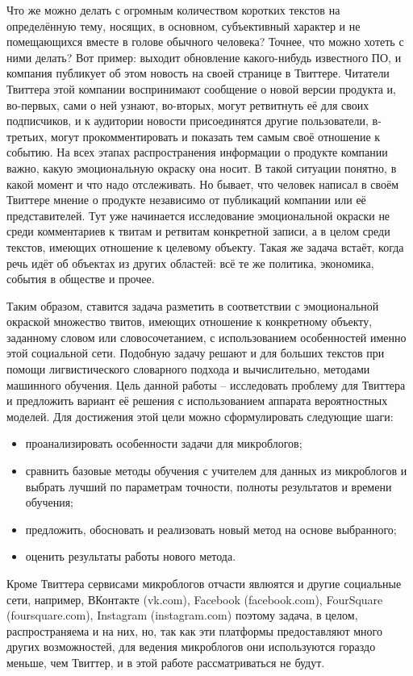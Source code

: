 Что же можно делать с огромным количеством коротких текстов на определённую
тему, носящих, в основном, субъективный характер и не помещающихся вместе
в голове обычного человека? Точнее, что можно хотеть с ними делать? Вот пример:
выходит обновление какого-нибудь известного ПО, и компания публикует об этом
новость на своей странице в Твиттере. Читатели Твиттера этой компании воспринимают
сообщение о новой версии продукта и, во-первых, сами о ней узнают, во-вторых,
могут ретвитнуть её для своих подписчиков, и к аудитории новости присоединятся другие пользователи,
в-третьих, могут прокомментировать и показать тем самым своё отношение к событию.
На всех этапах распространения информации о продукте компании важно, какую
эмоциональную окраску она носит. В такой ситуации понятно, в какой момент и что
надо отслеживать. Но бывает, что человек написал в своём Твиттере мнение о
продукте независимо от публикаций компании или её представителей. Тут уже
начинается исследование эмоциональной окраски не среди комментариев к твитам и
ретвитам конкретной записи, а в целом среди текстов, имеющих отношение к целевому
объекту. Такая же задача встаёт, когда речь идёт об объектах из других областей:
всё те же политика, экономика, события в обществе и прочее.

Таким образом, ставится задача разметить в соответствии с эмоциональной окраской
множество твитов, имеющих отношение к конкретному объекту, заданному словом или
словосочетанием, с использованием особенностей именно этой социальной сети. Подобную
задачу решают и для больших текстов при помощи лигвистического словарного подхода и
вычислительно, методами машинного обучения. Цель данной работы --
исследовать проблему для Твиттера и предложить вариант её решения с использованием
аппарата вероятностных моделей. Для достижения этой цели можно сформулировать следующие шаги:
\begin{itemize}
\item проанализировать особенности задачи для микроблогов;
\item сравнить базовые методы обучения с учителем для данных из микроблогов и выбрать лучший по
  параметрам точности, полноты результатов и времени обучения;
\item предложить, обосновать и реализовать новый метод на основе выбранного;
\item оценить результаты работы нового метода.
\end{itemize}

Кроме Твиттера сервисами микроблогов отчасти явлюятся и другие социальные сети, например,
ВКонтакте (vk.com), Facebook (facebook.com), FourSquare (foursquare.com),
Instagram (instagram.com) поэтому задача, в целом, распространяема и на них,
но, так как эти платформы предоставляют много других возможностей, для ведения
микроблогов они используются гораздо меньше, чем Твиттер, и в этой работе
рассматриваться не будут.
